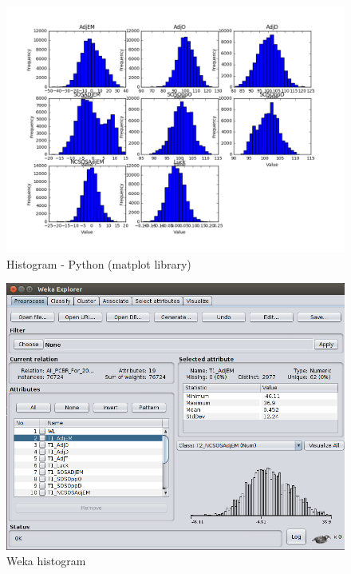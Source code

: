 \documentclass[
10pt, %
a4paper, %
oneside, %
headinclude,footinclude, %
BCOR5mm, %
]{scrartcl}
\begin{document}
\begin{figure}[H]
\caption{Histogram - Python (matplot library)}
  \centering
\includegraphics[width=\textwidth]{Histograms}
\end{figure}

\begin{figure}[H]
\caption{Weka histogram}
  \centering
\includegraphics[width=\textwidth]{Weka_Histogram1.png}
\end{figure}
\end{document}
